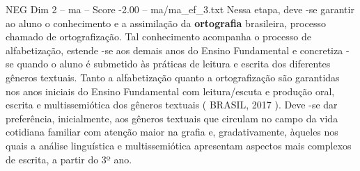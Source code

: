 \begin{textsample}{NEG Dim 2 – ma – Score -2.00 – ma/ma\_ef\_3.txt}
Nessa etapa, deve -se garantir ao aluno o conhecimento e a assimilação da \textbf{ortografia} brasileira, processo chamado de ortografização.
Tal conhecimento acompanha o processo de alfabetização, estende -se aos demais anos do Ensino Fundamental e concretiza -se quando o aluno é submetido às práticas de leitura e escrita dos diferentes gêneros textuais.
Tanto a alfabetização quanto a ortografização são garantidas nos anos iniciais do Ensino Fundamental com leitura/escuta e produção oral, escrita e multissemiótica dos gêneros textuais ( BRASIL, 2017 ).
Deve -se dar preferência, inicialmente, aos gêneros textuais que circulam no campo da vida cotidiana familiar com atenção maior na grafia e, gradativamente, àqueles nos quais a análise linguística e multissemiótica apresentam aspectos mais complexos de escrita, a partir do 3º ano.

\end{textsample}
